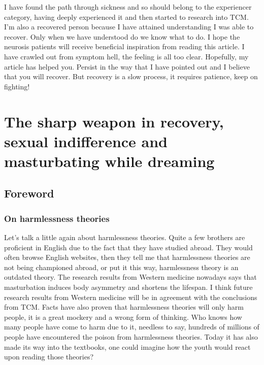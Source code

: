 \documentclass[
]{book}
\begin{document}
I have found the path through sickness and so should belong to the experiencer category, having deeply experienced it and then started to research into TCM. I'm also a recovered person because I have attained understanding I was able to recover. Only when we have understood do we know what to do. I hope the neurosis patients will receive beneficial inspiration from reading this article. I have crawled out from symptom hell, the feeling is all too clear. Hopefully, my article has helped you. Persist in the way that I have pointed out and I believe that you will recover. But recovery is a slow process, it requires patience, keep on fighting!

\hypertarget{the-sharp-weapon-in-recovery-sexual-indifference-and-masturbating-while-dreaming}{%
\chapter{The sharp weapon in recovery, sexual indifference and masturbating while dreaming}\label{the-sharp-weapon-in-recovery-sexual-indifference-and-masturbating-while-dreaming}}

\hypertarget{foreword-9}{%
\section{Foreword}\label{foreword-9}}

\hypertarget{on-harmlessness-theories}{%
\subsection{On harmlessness theories}\label{on-harmlessness-theories}}

Let's talk a little again about harmlessness theories. Quite a few brothers are proficient in English due to the fact that they have studied abroad. They would often browse English websites, then they tell me that harmlessness theories are not being championed abroad, or put it this way, harmlessness theory is an outdated theory. The research results from Western medicine nowadays says that masturbation induces body asymmetry and shortens the lifespan. I think future research results from Western medicine will be in agreement with the conclusions from TCM. Facts have also proven that harmlessness theories will only harm people, it is a great mockery and a wrong form of thinking. Who knows how many people have come to harm due to it, needless to say, hundreds of millions of people have encountered the poison from harmlessness theories. Today it has also made its way into the textbooks, one could imagine how the youth would react upon reading those theories?
\end{document}
